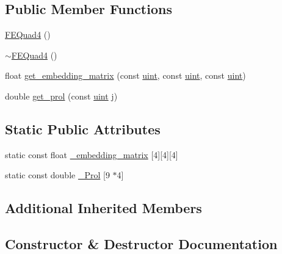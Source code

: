 \subsection*{Public Member Functions}
\begin{DoxyCompactItemize}
\item 
\mbox{\hyperlink{classfemus_1_1_f_e_quad4_a540dc17355ed62d316d5e042c9f2fc8f}{F\+E\+Quad4}} ()
\item 
\mbox{\hyperlink{classfemus_1_1_f_e_quad4_aed2a1a74edd5656589330752af452d43}{$\sim$\+F\+E\+Quad4}} ()
\item 
float \mbox{\hyperlink{classfemus_1_1_f_e_quad4_a1532326493b4b2477fffa1b97617fb99}{get\+\_\+embedding\+\_\+matrix}} (const \mbox{\hyperlink{_typedefs_8hpp_a91ad9478d81a7aaf2593e8d9c3d06a14}{uint}}, const \mbox{\hyperlink{_typedefs_8hpp_a91ad9478d81a7aaf2593e8d9c3d06a14}{uint}}, const \mbox{\hyperlink{_typedefs_8hpp_a91ad9478d81a7aaf2593e8d9c3d06a14}{uint}})
\item 
double \mbox{\hyperlink{classfemus_1_1_f_e_quad4_a9e4a6666afa17aa1f3842c32b15d67fe}{get\+\_\+prol}} (const \mbox{\hyperlink{_typedefs_8hpp_a91ad9478d81a7aaf2593e8d9c3d06a14}{uint}} j)
\end{DoxyCompactItemize}
\subsection*{Static Public Attributes}
\begin{DoxyCompactItemize}
\item 
static const float \mbox{\hyperlink{classfemus_1_1_f_e_quad4_afef5d02eba123c9b52584ad45df917ba}{\+\_\+embedding\+\_\+matrix}} \mbox{[}4\mbox{]}\mbox{[}4\mbox{]}\mbox{[}4\mbox{]}
\item 
static const double \mbox{\hyperlink{classfemus_1_1_f_e_quad4_a122dd9ad9c7c989bcfae011d0d08a9ce}{\+\_\+\+Prol}} \mbox{[}9 $\ast$4\mbox{]}
\end{DoxyCompactItemize}
\subsection*{Additional Inherited Members}


\subsection{Constructor \& Destructor Documentation}
\mbox{\label{classfemus_1_1_f_e_quad4_a540dc17355ed62d316d5e042c9f2fc8f}} 
